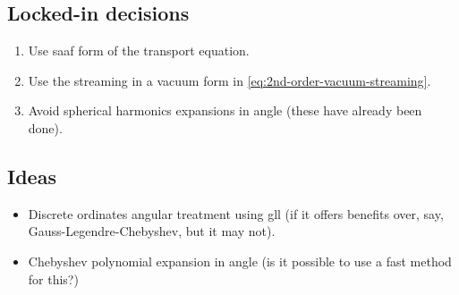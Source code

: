 \documentclass[11pt]{article}
\begin{document}
\subsection*{Locked-in decisions}
\begin{enumerate}
    \item Use \gls{saaf} form of the transport equation.
    \item Use the streaming in a vacuum form in \cref{eq:2nd-order-vacuum-streaming}.
    \item Avoid spherical harmonics expansions in angle (these have already been done).
\end{enumerate}

\subsection*{Ideas}
\begin{itemize}
    \item Discrete ordinates angular treatment using \gls{gll} (if it offers benefits over, say, Gauss-Legendre-Chebyshev, but it may not).
    \item Chebyshev polynomial expansion in angle (is it possible to use a fast method for this?)
\end{itemize}

\clearpage
\printbibliography
\end{document}
